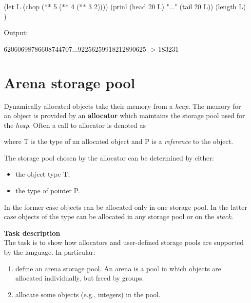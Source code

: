 \begin{wideverbatim}

(let L (chop (** 5 (** 4 (** 3 2))))
   (prinl (head 20 L) "..." (tail 20 L))
   (length L) )

Output:

62060698786608744707...92256259918212890625
-> 183231

\end{wideverbatim}

\pagebreak{}
\section*{Arena storage pool}

Dynamically allocated objects take their memory from a \emph{heap}.
The memory for an object is provided by an \textbf{allocator} which
maintains the storage pool used for the \emph{heap}. Often a call to
allocator is denoted as

\begin{Shaded}
\begin{Highlighting}[]
 
\end{Highlighting}
\end{Shaded}

where T is the type of an allocated object and P is a \emph{reference}
to the object.

The storage pool chosen by the allocator can be determined by either:

\begin{itemize}
\item
  the object type T;
\item
  the type of pointer P.
\end{itemize}

In the former case objects can be allocated only in one storage pool.
In the latter case objects of the type can be allocated in any storage
pool or on the \emph{stack}.

\textbf{Task description}\\ The task is to show how allocators and
user-defined storage pools are supported by the language. In particular:

\begin{enumerate}
\item
  define an arena storage pool. An arena is a pool in which objects are
  allocated individually, but freed by groups.
\item
  allocate some objects (e.g., integers) in the pool.
\end{enumerate}

